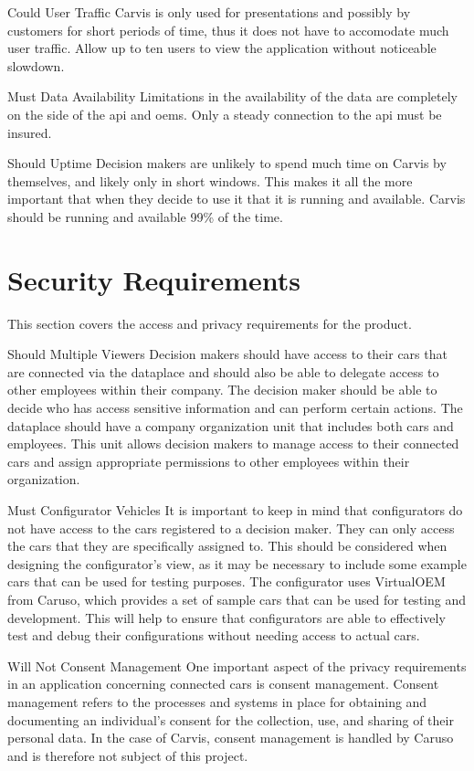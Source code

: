{Could}
{User Traffic}
{Carvis is only used for presentations and possibly by customers for short periods of time, thus it does not have to accomodate much user traffic.}
{Allow up to ten users to view the application without noticeable slowdown.}

{Must}
{Data Availability}
{Limitations in the availability of the \gls{data} are completely on the side of the \gls{api} and \glspl{oem}. Only a steady connection to the \gls{api} must be insured.}
{}

{Should}
{Uptime}
{Decision makers are unlikely to spend much time on Carvis by themselves, and likely only in short windows. This makes it all the more important that when they decide to use it that it is running and available.}
{Carvis should be running and available 99\% of the time.}


\section{Security Requirements}

This section covers the access and privacy requirements for the product.

{Should}
{Multiple Viewers}
{Decision makers should have access to their cars that are connected via the \gls{dataplace} and should also be able to delegate access to other employees within their company. The decision maker should be able to decide who has access sensitive information and can perform certain actions.}
{The \gls{dataplace} should have a company organization unit that includes both cars and employees. This unit allows decision makers to manage access to their connected cars and assign appropriate permissions to other employees within their organization.}

{Must}
{Configurator Vehicles}
{It is important to keep in mind that configurators do not have access to the cars registered to a decision maker. They can only access the cars that they are specifically assigned to. This should be considered when designing the configurator's view, as it may be necessary to include some example cars that can be used for testing purposes.}
{The configurator uses VirtualOEM from Caruso, which provides a set of sample cars that can be used for testing and development. This will help to ensure that configurators are able to effectively test and debug their configurations without needing access to actual cars.}

{Will Not}
{Consent Management}
{One important aspect of the privacy requirements in an application concerning connected cars is consent management. Consent management refers to the processes and systems in place for obtaining and documenting an individual's consent for the collection, use, and sharing of their personal data. In the case of Carvis, consent management is handled by Caruso and is therefore not subject of this project.}


